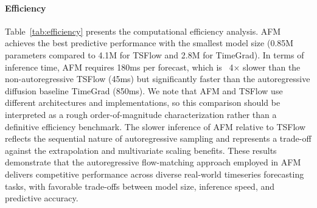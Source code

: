 \documentclass[preprint,12pt,authoryear]{elsarticle}
\newcommand{\oldrev}[1]{#1}
\begin{document}
\paragraph{Efficiency}
Table~\ref{tab:efficiency} presents the computational efficiency analysis. AFM achieves the best predictive performance with the smallest model size (0.85M parameters compared to 4.1M for TSFlow and 2.8M for TimeGrad). In terms of inference time, AFM requires 180ms per forecast, which is ~4× slower than the non-autoregressive TSFlow (45ms) but significantly faster than the autoregressive diffusion baseline TimeGrad (850ms). \oldrev{We note that AFM and TSFlow use different architectures and implementations, so this comparison should be interpreted as a rough order-of-magnitude characterization rather than a definitive efficiency benchmark. The slower inference of AFM relative to TSFlow reflects the sequential nature of autoregressive sampling and represents a trade-off against the extrapolation and multivariate scaling benefits.} These results demonstrate that the autoregressive flow-matching approach employed in AFM delivers competitive performance across diverse real-world timeseries forecasting tasks, with favorable trade-offs between model size, inference speed, and predictive accuracy.
\end{document}
